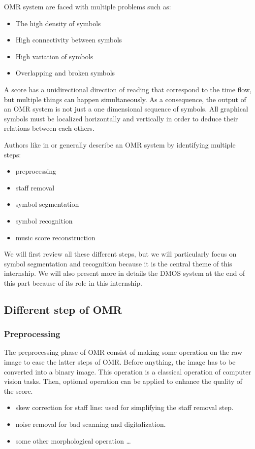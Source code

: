 \documentclass[11pt]{sdm}
\begin{document}
OMR system are faced with multiple problems such as:
\begin{itemize}
  \item The high density of symbols
  \item High connectivity between symbols
  \item High variation of symbols
  \item Overlapping and broken symbols
\end{itemize}
A score has a unidirectional direction of reading that correspond to the time flow, but multiple things can happen simultaneously.
As a consequence, the output of an OMR system is not just a one dimensional sequence of symbols.
All graphical symbols must be localized horizontally and vertically in order to deduce their relations between each others.


Authors like in \cite{rebelo_optical_2012} or \cite{fornes_analysis_2014} generally describe an OMR system by identifying multiple steps:
\begin{itemize}
  \item preprocessing
  \item staff removal
  \item symbol segmentation
  \item symbol recognition
  \item music score reconstruction
\end{itemize}
We will first review all these different steps, but we will particularly focus on symbol segmentation and recognition because it is the central theme of this internship.
We will also present more in details the DMOS system at the end of this part because of its role in this internship.


\subsection{Different step of OMR}


\subsubsection{Preprocessing}


The preprocessing phase of OMR consist of making some operation on the raw image to ease the latter steps of OMR.
Before anything, the image has to be converted into a binary image.
This operation is a classical operation of computer vision tasks.
Then, optional operation can be applied to enhance the quality of the score.
\begin{itemize}
  \item skew correction for staff line: used for simplifying the staff removal step.
  \item noise removal for bad scanning and digitalization.
  \item some other morphological operation \ldots
\end{itemize}
\end{document}
